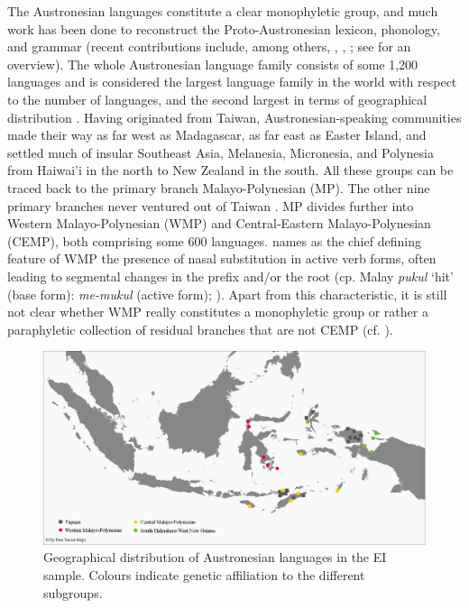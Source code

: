 The Austronesian languages constitute a clear monophyletic group, and much work has been done to reconstruct the Proto-Austronesian lexicon, phonology, and grammar (recent contributions include, among others, \citealt{Tryon1995}, \citealt{wouk2002history}, \citealt{blust2009austronesian}; see \citealt{adelaar2005austronesian} for an overview). The whole Austronesian language family consists of some 1,200 languages and is considered the largest language family in the world with respect to the number of languages, and the second largest in terms of geographical distribution \citep{adelaar2005austronesian}. Having originated from Taiwan, Austronesian-speaking communities made their way as far west as Madagascar, as far east as Easter Island, and settled much of insular Southeast Asia, Melanesia, Micronesia, and Polynesia from Haiwai'i in the north to New Zealand in the south. All these groups can be traced back to the primary branch Malayo-Polynesian (MP). The other nine primary branch\-es never ventured out of Taiwan \citep{blust2009austronesian}. MP divides further into Western Malayo-Polynesian (WMP) and Central-Eastern Malayo-Polynesian (CEMP), both comprising some 600 languages. \citet{blust2009austronesian} names as the chief defining feature of WMP the presence of nasal substitution in active verb forms, often leading to segmental changes in the prefix and/or the root (cp. Malay \textit{pukul} `hit' (base form): \textit{me-mukul} (active form); \citealt[30]{blust2009austronesian}). Apart from this characteristic, it is still not clear whether WMP really constitutes a monophyletic group or rather a paraphyletic collection of residual branches that are not CEMP (cf. \citealt[30]{blust2009austronesian}). 

\begin{figure}
\includegraphics[width=\columnwidth]{figures/Map_overview_klein_Austroaff.eps}
\caption[Geographical distribution of Austronesian languages in the sample]{Geographical distribution of Austronesian languages in the EI sample. Colours indicate genetic affiliation to the different subgroups.}\label{map:Austro1}
\end{figure}


